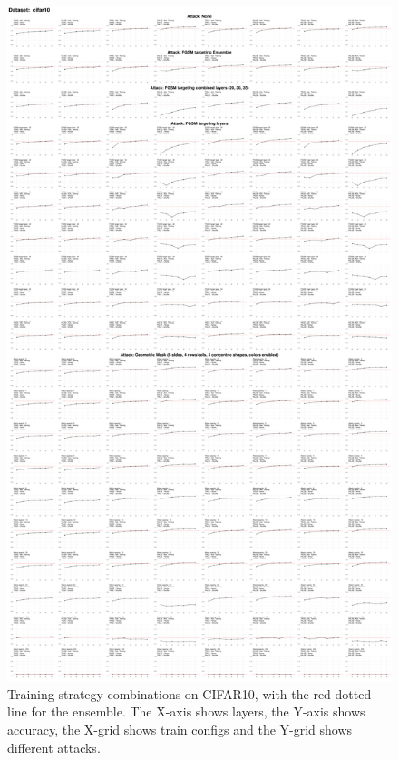\documentclass[a4paper, oneside]{discothesis}
\begin{document}
\begin{figure}
	\centering
	\includegraphics[width=\textwidth,height=\textheight,keepaspectratio]{figures/self_ensemble_8train_cifar10.pdf}
	\caption{Training strategy combinations on CIFAR10, with the red dotted line for the ensemble. The X-axis shows layers, the Y-axis shows accuracy, the X-grid shows train configs and the Y-grid shows different attacks.}
	\label{fig:8train-cifar10}
\end{figure}
\end{document}

